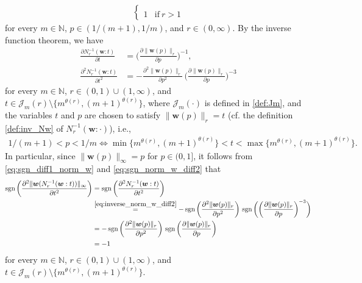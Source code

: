 \documentclass[conference, draftcls, onecolumn]{IEEEtran}
\theoremstyle{plain}
\newcommand{\bvec}[1]{\boldsymbol{#1}}
\newcommand{\sgn}{\operatorname{sgn}}
\newcommand{\lemref}[1]{Lemma~\ref{#1}}
\begin{document}
\begin{IEEEproof}[Proof of \lemref{lem:convex_w}]
\begin{align}
\begin{cases}
\\
1
& \mathrm{if} \ r > 1
\end{cases}
\label{eq:sgn_norm_w_diff2}
\end{align}
for every $m \in \mathbb{N}$, $p \in (1/(m+1), 1/m)$, and $r \in (0, \infty)$.
By the inverse function theorem, we have
\begin{align}
\frac{ \partial N_{r}^{-1}( \bvec{w} : t ) }{ \partial t }
& =
\bigg( \frac{ \partial \| \bvec{w}( p ) \|_{r} }{ \partial p } \bigg)^{-1} ,
\label{eq:inverse_norm_w_diff1} \\
\frac{ \partial^{2} N_{r}^{-1}( \bvec{w} : t ) }{ \partial t^{2} }
& =
- \frac{ \partial^{2} \| \bvec{w}( p ) \|_{r} }{ \partial p^{2} } \, \bigg( \frac{ \partial \| \bvec{w}( p ) \|_{r} }{ \partial p } \bigg)^{-3}
\label{eq:inverse_norm_w_diff2}
\end{align}
for every $m \in \mathbb{N}$, $r \in (0, 1) \cup (1, \infty)$, and $t \in \mathcal{J}_{m}( r ) \setminus \{ m^{\theta( r )}, (m+1)^{\theta( r )} \}$, where $\mathcal{J}_{m}( \cdot )$ is defined in \eqref{def:Jm}, and the variables $t$ and $p$ are chosen to satisfy $\| \bvec{
w}( p ) \|_{r} = t$ (cf. the definition \eqref{def:inv_Nw} of $N_{r}^{-1}( \bvec{w} : \cdot )$), i.e.,
\begin{align}
1/(m+1) < p < 1/m
\iff
\min\{ m^{\theta( r )}, (m+1)^{\theta( r )} \} < t < \max\{ m^{\theta( r )}, (m+1)^{\theta( r )} \} .
\label{eq:p_t_Jm}
\end{align}
In particular, since $\| \bvec{w}( p ) \|_{\infty} = p$ for $p \in (0, 1]$, it follows from \eqref{eq:sgn_diff1_norm_w} and \eqref{eq:sgn_norm_w_diff2} that
\begin{align}
\sgn\bigg( \frac{ \partial^{2} \| \bvec{w}( N_{r}^{-1}( \bvec{w} : t ) ) \|_{\infty} }{ \partial t^{2} } \bigg)
& =
\sgn\bigg( \frac{ \partial^{2} N_{r}^{-1}( \bvec{w} : t ) }{ \partial t^{2} } \bigg)
\\
& \overset{\eqref{eq:inverse_norm_w_diff2}}{=}
- \sgn\bigg( \frac{ \partial^{2} \| \bvec{w}( p ) \|_{r} }{ \partial p^{2} } \bigg) \, \sgn\bigg( \bigg( \frac{ \partial \| \bvec{w}( p ) \|_{r} }{ \partial p } \bigg)^{-3} \bigg)
\\
& =
- \sgn\bigg( \frac{ \partial^{2} \| \bvec{w}( p ) \|_{r} }{ \partial p^{2} } \bigg) \, \sgn\bigg( \frac{ \partial \| \bvec{w}( p ) \|_{r} }{ \partial p } \bigg)
\\
& =
- 1
\label{eq:sgn_norm_w_diff2_r_inf}
\end{align}
for every $m \in \mathbb{N}$, $r \in (0, 1) \cup (1, \infty)$, and $t \in \mathcal{J}_{m}( r ) \setminus \{ m^{\theta( r )}, (m+1)^{\theta( r )} \}$.

\end{IEEEproof}
\end{document}
